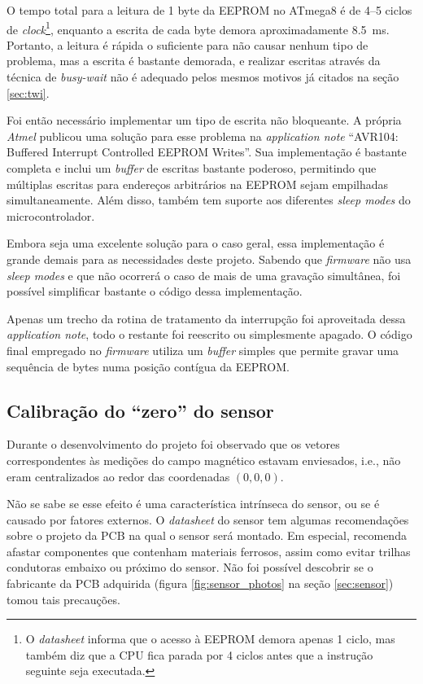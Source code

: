 \documentclass[brazil,pagestart=firstchapter]{abnt}
\makeatletter
\newcommand*{\ie}{i.e.\@\xspace}
\makeatother
\begin{document}
O tempo total para a leitura de 1 byte da \ac{EEPROM} no ATmega8 é de
\numrange[range-phrase={ ou }]{4}{5} ciclos de \textit{clock}\footnote{
	O \textit{datasheet} informa que o acesso à \ac{EEPROM} demora apenas
	1 ciclo, mas também diz que a CPU fica parada por 4 ciclos antes que
	a instrução seguinte seja executada.
}, enquanto a escrita de cada byte demora aproximadamente
\SI{8.5}{\milli\second}. \cite[p.~21]{ATmega8} Portanto, a leitura é rápida
o suficiente para não causar nenhum tipo de problema, mas a escrita
é bastante demorada, e realizar escritas através da técnica de
\textit{busy-wait} não é adequado pelos mesmos motivos já citados na seção
\ref{sec:twi}.

Foi então necessário implementar um tipo de escrita não bloqueante.
A própria \textit{Atmel} publicou uma solução para esse problema na
\textit{application note} ``AVR104: Buffered Interrupt Controlled EEPROM
Writes''. \cite{AVR104} Sua implementação é bastante completa e inclui um
\textit{buffer} de escritas bastante poderoso, permitindo que múltiplas
escritas para endereços arbitrários na \ac{EEPROM} sejam empilhadas
simultaneamente. Além disso, também tem suporte aos diferentes \textit{sleep
modes} do microcontrolador. \cite[p.~33]{ATmega8}

Embora seja uma excelente solução para o caso geral, essa implementação
é grande demais para as necessidades deste projeto.
Sabendo que \textit{firmware} não usa \textit{sleep modes} e que não
ocorrerá o caso de mais de uma gravação simultânea, foi possível simplificar
bastante o código dessa implementação.

Apenas um trecho da rotina de tratamento da interrupção foi aproveitada
dessa \textit{application note}, todo o restante foi reescrito ou
simplesmente apagado.  O código final empregado no \textit{firmware} utiliza
um \textit{buffer} simples que permite gravar uma sequência de bytes numa
posição contígua da \ac{EEPROM}.


\subsection{Calibração do ``zero'' do sensor}
\label{sub:zerocal}

Durante o desenvolvimento do projeto foi observado que os vetores
correspondentes às medições do campo magnético estavam enviesados, \ie, não
eram centralizados ao redor das coordenadas $(0, 0, 0)$.

Não se sabe se esse efeito é uma característica intrínseca do sensor, ou se
é causado por fatores externos. O \textit{datasheet} do sensor tem algumas
recomendações sobre o projeto da \ac{PCB} na qual o sensor será montado. Em
especial, recomenda afastar componentes que contenham materiais ferrosos,
assim como evitar trilhas condutoras embaixo ou próximo do sensor.
\cite[p.~5]{HMC5883L} Não foi possível descobrir se o fabricante da \ac{PCB}
adquirida (figura \ref{fig:sensor_photos} na seção
\ref{sec:sensor}) tomou tais precauções.
\end{document}
